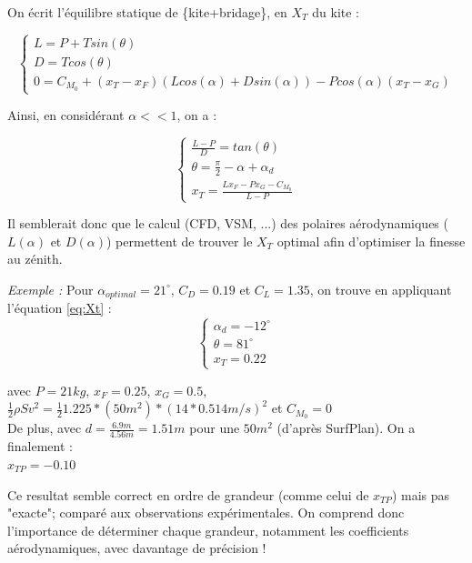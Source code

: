 On écrit l'équilibre statique de \{kite+bridage\}, en $X_T$ du kite : 

\begin{equation}
    \begin{cases}
        L = P + T sin(\theta) \\
        D = T cos(\theta) \\
        0 = C_{M_0} + (x_T - x_F) (L cos(\alpha) + D sin(\alpha)) - P cos(\alpha) (x_T - x_G)
    \end{cases}
\end{equation}

Ainsi, en considérant $\alpha << 1$, on a :

\begin{equation}
    \begin{cases}
    \frac{L-P}{D} = tan(\theta) \\
    \theta = \frac{\pi}{2} - \alpha + \alpha_d \\
    x_T = \frac{L x_F - P x_G -C_{M_0}}{L - P}
    \end{cases}
    \label{eq:Xt}
\end{equation}
    
Il semblerait donc que le calcul (CFD, VSM, ...) des polaires aérodynamiques ($L(\alpha)$ et $D(\alpha)$) permettent de trouver le $X_T$ optimal afin d'optimiser la finesse au zénith. 

\textit{Exemple : }
Pour $\alpha_{optimal} = 21^\circ$, $C_D = 0.19$ et $C_L = 1.35$, on trouve en appliquant l'équation \ref{eq:Xt} : \\

\begin{equation}
    \begin{cases}
    \alpha_d =  -12^\circ\\
    \theta = 81^\circ\\
    x_T = 0.22
    \end{cases}
    \label{eq:Xt results}
\end{equation}

avec $P = 21 kg$, $x_F = 0.25$, $x_G = 0.5$,$\frac{1}{2} \rho S v^2 = \frac{1}{2} 1.225 * (50m^2) * (14 * 0.514 m/s)^2$  et $C_{M_0} = 0$ \\

De plus, avec  $d = \frac{6.9 m}{4.56 m} = 1.51 m$ pour une $50m^2$ (d'après SurfPlan). On a finalement :\\
$x_{TP} = -0.10 $

Ce resultat semble correct en ordre de grandeur (comme celui de $x_{TP}$) mais pas "exacte"; comparé aux observations expérimentales. On comprend donc l'importance de déterminer chaque grandeur, notamment les coefficients aérodynamiques, avec davantage de précision !

